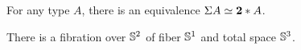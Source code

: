 \documentclass[hott-all.tex]{subfiles}
\begin{document}
% 
% 
% 
% 
\begin{lem}
  For any type $A$, there is an equivalence $\Sigma A \simeq \mathbf{2}*A$.
\end{lem}
% 
% 
% 
\begin{thm}
  There is a fibration over $\mathbb{S}^2$ of fiber $\mathbb{S}^1$ and total space $\mathbb{S}^3$.
\end{thm}
% 
\end{document}
